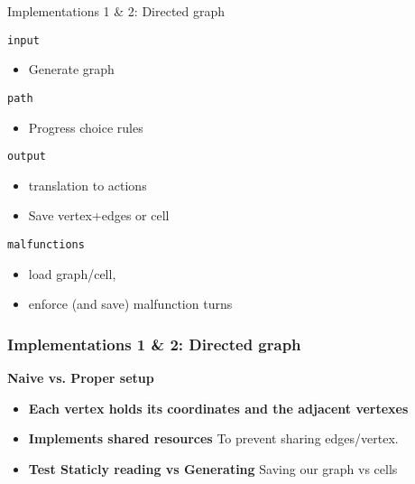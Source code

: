 \begin{frame}{Implementations 1 \& 2: Directed graph}
	\begin{minipage}{0.5\textwidth}
		\begin{tcolorbox}[colframe=black, colback=white, sharp corners=all, boxrule=0.5mm]
			\texttt{input}
			\begin{itemize}
				\item Generate graph
			\end{itemize}

		\end{tcolorbox}
				\begin{tcolorbox}[colframe=black, colback=white, sharp corners=all, boxrule=0.5mm]
			\texttt{path}
			\begin{itemize}
				\item Progress choice rules
			\end{itemize}

		\end{tcolorbox}
		
	\end{minipage}%
	\begin{minipage}{0.5\textwidth}
		\begin{tcolorbox}[colframe=black, colback=white, sharp corners=all, boxrule=0.5mm]
			\texttt{output}
			\begin{itemize}
				\item translation to actions
				\item Save vertex+edges or cell 
			\end{itemize}
		\end{tcolorbox}
		\begin{tcolorbox}[colframe=black, colback=white, sharp corners=all, boxrule=0.5mm]
			\texttt{malfunctions}
			\begin{itemize}
				\item load graph/cell, 
				\item enforce (and save) malfunction turns
			\end{itemize}
		\end{tcolorbox}
	\end{minipage}
\end{frame}

\begin{frame}
	\frametitle{Implementations 1 \& 2: Directed graph}
	\textbf{Naive vs. Proper setup} 
	\begin{itemize}
		\item \textbf{Each vertex holds its coordinates and the adjacent vertexes} 
		\item \textbf{Implements shared resources} To prevent sharing edges/vertex. 
		\item \textbf{Test Staticly reading vs Generating}  Saving our graph vs cells 		
	\end{itemize}
\end{frame}




